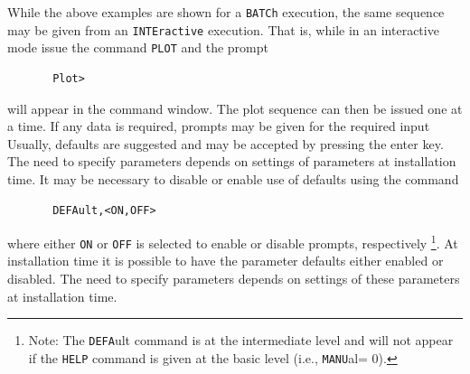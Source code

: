 While the above examples are shown for a {\tt BATCh} execution, the same
sequence may be given from an {\tt INTEractive} execution.  That is,
while in an interactive mode issue the command {\tt PLOT} and the prompt
\begin{verbatim}
       Plot>
\end{verbatim}
will appear in the command window.
The plot sequence can then be issued one at a time.  If any
data is required, prompts may be given for the required input
Usually, defaults are suggested and may be accepted by pressing the enter key.
The need to specify parameters depends on
settings of parameters at installation time.
It may be necessary to disable or enable use of defaults using the command
\begin{verbatim}
       DEFAult,<ON,OFF>
\end{verbatim}
where either {\tt ON} or {\tt OFF} is selected to enable or disable prompts,
respectively
{\footnote{Note: The {\tt DEFA}ult command is at the intermediate level
and will not appear if the {\tt HELP} command is given at the basic level
(i.e., {\tt MANU}al= 0).}}.
At installation time it is possible to have the parameter defaults either
enabled or disabled.
The need to specify parameters depends on
settings of these parameters at installation time.
